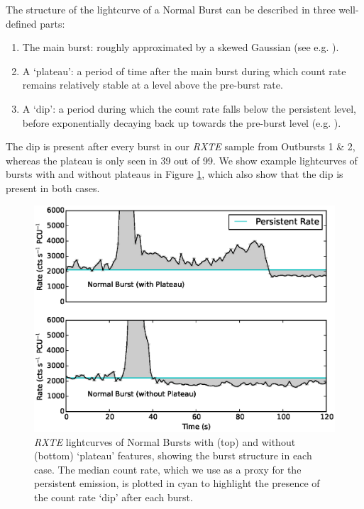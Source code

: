 \par The structure of the lightcurve of a Normal Burst can be described in three well-defined parts:

\begin{enumerate}
\item The main burst: roughly approximated by a skewed Gaussian (see e.g. \citealp{Azzalini_Dist}).
\item A `plateau': a period of time after the main burst during which count rate remains relatively stable at a level above the pre-burst rate.
\item A `dip': a period during which the count rate falls below the persistent level, before exponentially decaying back up towards the pre-burst level (e.g. \citealp{Younes_Expo}).
\end{enumerate}

\par The dip is present after every burst in our \textit{RXTE} sample from Outbursts 1 \& 2, whereas the plateau is only seen in 39 out of 99.  We show example lightcurves of bursts with and without plateaus in Figure \ref{fig:w_wo}, which also show that the dip is present in both cases.

\begin{figure}
  \centering
  \includegraphics[width=.9\linewidth, trim={0.8cm 0 1.6cm 0},clip]{images/w_woburst.eps}
  \caption[\textit{RXTE} lightcurves of Normal Bursts with (top) and without (bottom) `plateau' features, showing the burst structure in each case.]{\small \textit{RXTE} lightcurves of Normal Bursts with (top) and without (bottom) `plateau' features, showing the burst structure in each case.  The median count rate, which we use as a proxy for the persistent emission, is plotted in cyan to highlight the presence of the count rate `dip' after each burst.}
  \label{fig:w_wo}
\end{figure}

